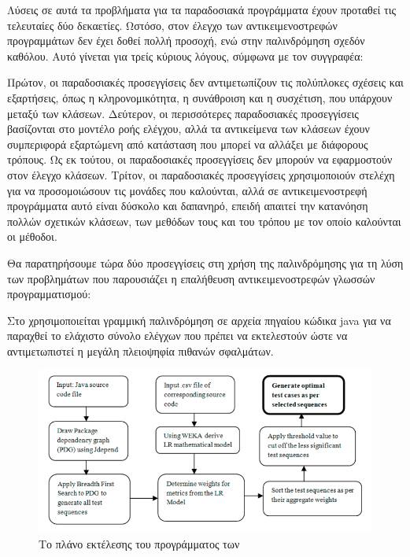 \documentclass[12pt]{article}
\begin{document}
\par Λύσεις σε αυτά τα προβλήματα για τα παραδοσιακά προγράμματα έχουν προταθεί τις τελευταίες δύο δεκαετίες. Ωστόσο, στον έλεγχο των αντικειμενοστρεφών προγραμμάτων δεν έχει δοθεί πολλή προσοχή, ενώ στην παλινδρόμηση σχεδόν καθόλου. Αυτό γίνεται για τρείς κύριους λόγους, σύμφωνα με τον συγγραφέα:

\par Πρώτον, οι παραδοσιακές προσεγγίσεις δεν αντιμετωπίζουν τις πολύπλοκες σχέσεις και εξαρτήσεις, όπως η κληρονομικότητα, η συνάθροιση και η συσχέτιση, που υπάρχουν μεταξύ των κλάσεων. Δεύτερον, οι περισσότερες παραδοσιακές προσεγγίσεις βασίζονται στο μοντέλο ροής ελέγχου, αλλά τα αντικείμενα των κλάσεων έχουν συμπεριφορά εξαρτώμενη από κατάσταση που μπορεί να αλλάξει με διάφορους τρόπους. Ως εκ τούτου, οι παραδοσιακές προσεγγίσεις δεν μπορούν να εφαρμοστούν στον έλεγχο κλάσεων. Τρίτον, οι παραδοσιακές προσεγγίσεις χρησιμοποιούν στελέχη για να προσομοιώσουν τις μονάδες που καλούνται, αλλά σε αντικειμενοστρεφή προγράμματα αυτό είναι δύσκολο και δαπανηρό, επειδή απαιτεί την κατανόηση πολλών σχετικών κλάσεων, των μεθόδων τους και του τρόπου με τον οποίο καλούνται οι μέθοδοι.

\par Θα παρατηρήσουμε τώρα δύο προσεγγίσεις στη χρήση της παλινδρόμησης για τη λύση των προβλημάτων που παρουσιάζει η επαλήθευση αντικειμενοστρεφών γλωσσών προγραμματισμού:

\par Στο \textcite{divya} χρησιμοποιείται γραμμική παλινδρόμηση σε αρχεία πηγαίου κώδικα java για να παραχθεί το ελάχιστο σύνολο ελέγχων που πρέπει να εκτελεστούν ώστε να αντιμετωπιστεί η μεγάλη πλειοψηφία πιθανών σφαλμάτων.

\begin{figure}
\label{fig:regression}
\caption{Το πλάνο εκτέλεσης του προγράμματος των \textcite{divya}}
\includegraphics[width=\textwidth,height=\textheight,keepaspectratio]{regression_plan.PNG}
\end{figure}
\end{document}
